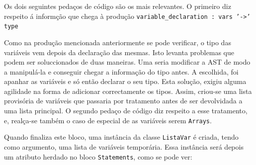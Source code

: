 \documentclass[11pt,a4paper]{article}
\begin{document}
Os dois seguintes pedaços de código são os mais relevantes. O primeiro diz respeito á informção que chega à produção \texttt{variable\_declaration : vars '->' type}


Como na produção mencionada anteriormente se pode verificar, o tipo das variáveis vem depois da declaração das mesmas. Isto levanta problemas que podem ser soluccionados de duas maneiras.
Uma seria modificar a AST de modo a manipulá-la e conseguir chegar a informação do tipo antes. A escolhida, foi apanhar as variáveis e só então declarar o seu tipo. Esta solução, exigiu 
alguma agilidade na forma de adicionar correctamente os tipos. Assim, criou-se uma lista provisória de variáveis que passaria por tratamento antes de ser devolvidada a uma lista 
principal. O segundo pedaço de código diz respeito a esse tratamento, e, realça-se também o caso de especial de as variáveis serem \texttt{Arrays}.


Quando finaliza este bloco, uma instância da classe \texttt{ListaVar} é criada, tendo como argumento, uma lista de variáveis temporária. Essa instância será depois um atributo herdado 
no bloco \texttt{Statements}, como se pode ver:
\end{document}
